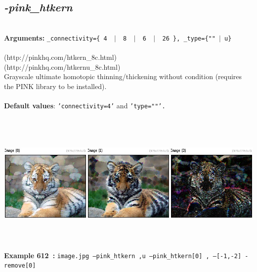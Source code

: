 \documentclass[a4paper,11pt,twoside]{book}
\begin{document}
\subsection{\emph{-pink\_htkern} }\vspace*{-0.5em}
~\\\textbf{Arguments: } 
{\small \texttt{\_connectivity=\{ 4 ~$|$~ 8 ~$|$~ 6 ~$|$~ 26 \}, \_type=\{""~$|$~u\}}}\\~\\
(http://pinkhq.com/htkern\_8c.html)
~\\(http://pinkhq.com/htkernu\_8c.html)
~\\Grayscale ultimate homotopic thinning/thickening without condition (requires the PINK library to be installed).
~\\~\\\textbf{Default values}: {\small \texttt{'connectivity=4'} and \texttt{'type=""'.}}
\begin{center}\includegraphics[keepaspectratio=true,height=7cm,width=\textwidth]{img/gmic_def612.jpg}\\
{\footnotesize \textbf{Example 612~:} \texttt{image.jpg --pink\_htkern ,u --pink\_htkern[0] , ---[-1,-2] -remove[0]}}
\end{center}
\end{document}
